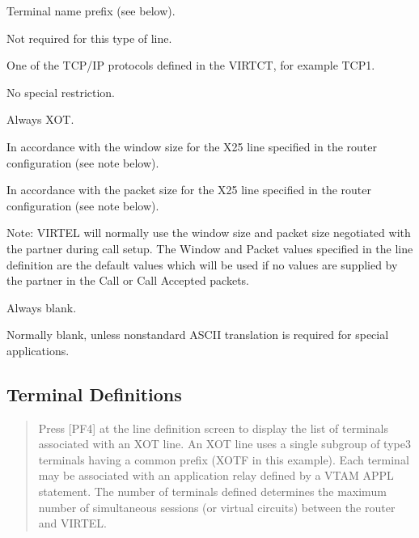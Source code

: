 \documentclass[letterpaper,10pt,english]{sphinxmanual}
\begin{document}
\begin{description}
\sphinxAtStartPar
Terminal name prefix (see below).

\sphinxAtStartPar
Not required for this type of line.

\sphinxAtStartPar
One of the TCP/IP protocols defined in the VIRTCT, for example TCP1.

\sphinxAtStartPar
No special restriction.

\sphinxAtStartPar
Always XOT.

\sphinxAtStartPar
In accordance with the window size for the X25 line specified in the router configuration (see note below).

\sphinxAtStartPar
In accordance with the packet size for the X25 line specified in the router configuration (see note below).

\sphinxAtStartPar
Note: VIRTEL will normally use the window size and packet size negotiated with the partner during call setup. The Window and Packet values specified in the line definition are the default values which will be used if no values are supplied by the partner in the Call or Call Accepted packets.

\sphinxAtStartPar
Always blank.

\sphinxAtStartPar
Normally blank, unless non\sphinxhyphen{}standard ASCII translation is required for special applications.

\end{description}

\ignorespaces 

\subsection{Terminal Definitions}
\label{\detokenize{connectivity_guide:index-53}}\label{\detokenize{connectivity_guide:id23}}\begin{quote}

\sphinxAtStartPar
Press {[}PF4{]} at the line definition screen to display the list of terminals associated with an XOT line. An XOT line uses a single sub\sphinxhyphen{}group of type\sphinxhyphen{}3 terminals having a common prefix (XOTF in this example). Each terminal may be associated with an application relay defined by a VTAM APPL statement. The number of terminals defined determines the maximum number of simultaneous sessions (or virtual circuits) between the router and VIRTEL.
\end{quote}
\end{document}
